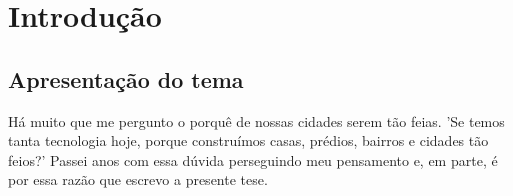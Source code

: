 \documentclass[twoside, 12pt, english,italian,latin,greek,french,spanish,brazil]{book}
\begin{document}
\newpage

\section{Introdução}
    \maketitle

    

    \subsection{Apresentação do tema}	

    Há muito que me pergunto o porquê de nossas cidades serem tão feias. 'Se temos tanta tecnologia hoje, porque construímos casas, prédios, bairros e cidades tão feios?' Passei anos com essa dúvida perseguindo meu pensamento e, em parte, é por essa razão que escrevo a presente tese.
\end{document}

